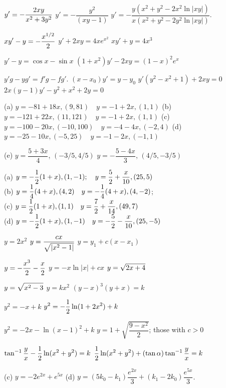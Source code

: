  $\displaystyle{y'=-\frac{2xy}{x^2+3y^2}}$
$y'=-\dfrac{y^2}{(xy-1)}$
$y'=-\dfrac{y(x^2+y^2-2x^2\ln|xy|)}{x(x^2+y^2-2y^2\ln|xy|)}$.

  $\displaystyle{xy'-y=-\frac{x^{1/2}}{2}}$
 $y'+2xy=4xe^{x^2}$
  $xy'+y=4x^3$

 $y'-y=\cos x-\sin x$
 $(1+x^2)y'-2xy=(1-x)^2e^x$

 $y'g-yg'=f'g-fg'$.
 $(x-x_0)y'=y-y_0$
  $y'(y^2-x^2+1)+2xy=0$
 $2x(y-1)y'-y^2+x^2+2y=0$

(a) $y=-81+18x, (9,81)   \quad y=-1+2x, (1,1)$
(b) $y=-121+22x, (11,121)   \quad y=-1+2x, (1,1)$
(c) $y=-100-20x, (-10,100)   \quad y=-4-4x, (-2,4)$
(d) $y=-25-10x, (-5,25)   \quad y=-1-2x, (-1,1)$

(e)
$y=\dfrac{5+3x}{4}$, $(-3/5,4/5)$
$y=-\dfrac{5-4x}{3}$, $(4/5,-3/5)$

(a) $\displaystyle{y=-\frac{1}{2}(1+x), (1,-1);   \quad y=
\frac{5}{2}+\frac{x}{10}, (25,5)}$\\
(b) $\displaystyle{y=\frac{1}{4}(4+x), (4,2)   \quad y
=-\frac{1}{4} (4+x), (4,-2)}$;\\
(c) $\displaystyle{y=\frac{1}{2}(1+x), (1,1)   \quad y=
\frac{7}{2}+\frac{x}{14}, (49,7)}$\\
(d) $\displaystyle{y=-\frac{1}{2}(1+x), (1,-1)   \quad y=
-\frac{5}{2}-\frac{x}{10}, (25,-5)}$

  $y=2x^2$
  $\displaystyle{y=\frac{cx}{\sqrt{|x^2-1|}}}$
  $y=y_1+c(x-x_1)$

  $\displaystyle{y=-\frac{x^3}{2}-\frac{x}{2}}$
  $y=-x\ln |x|+cx$
  $\displaystyle{y=\sqrt{2x+4}}$

 $\displaystyle{y=\sqrt{x^2-3}}$
  $y=kx^2$
 $(y-x)^3(y+x)=k$

 $y^2=-x+k$
 $\displaystyle{y^2=-\frac{1}{2}\ln (1+2x^2)+k}$

  $y^2=-2x-\ln (x-1)^2+k$
 $y=1+\sqrt{\dfrac{9-x^2}{2}}$; those with $c>0$

 $\displaystyle{\tan^{-1}\frac{y}{x}-\frac{1}{2}\ln(x^2+y^2)=k}$
$\displaystyle{\frac{1}{2}\ln (x^2+y^2)+(\tan\alpha)\tan^{-1}\frac{y}{x}=k}$



(c)  $y=-2e^{2x}+e^{5x}$
(d) $y=(5k_0-k_1)\dfrac{e^{2x}}{3}+(k_1-2k_0)\dfrac{e^{5x}}{3}$.

